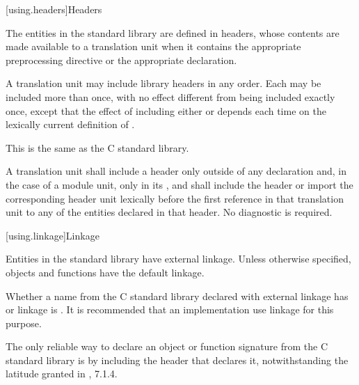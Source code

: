 [using.headers]{Headers}

\pnum
The entities in the \Cpp{} standard library are defined in headers,
whose contents are made available to a translation unit when it contains the appropriate
%
%
preprocessing directive
or the appropriate
%
 declaration.

\pnum
A translation unit may include library headers in any order.
%
Each may be included more than once, with no effect different from
being included exactly once, except that the effect of including either
 or 
depends each time on the lexically current definition of
%
%
.
\begin{footnote}
This is the same as the C standard library.
\end{footnote}

\pnum
A translation unit shall include a header only outside of any
%
declaration and,
in the case of a module unit,
only in its , and
shall include the header or import the corresponding header unit lexically
before the first reference in that translation unit to any of the entities
declared in that header. No diagnostic is required.

[using.linkage]{Linkage}

\pnum
Entities in the \Cpp{} standard library have external linkage.
Unless otherwise specified, objects and functions have the default
linkage.

\pnum
{}%
Whether a name from the C standard library declared with
external linkage has
%
%
%
or
%
linkage is . It is recommended that an
implementation use
linkage for this purpose.
\begin{footnote}
The only reliable way to declare an object or
function signature from the C standard library is by including the header that
declares it, notwithstanding the latitude granted in \IsoC{}, 7.1.4.
\end{footnote}

